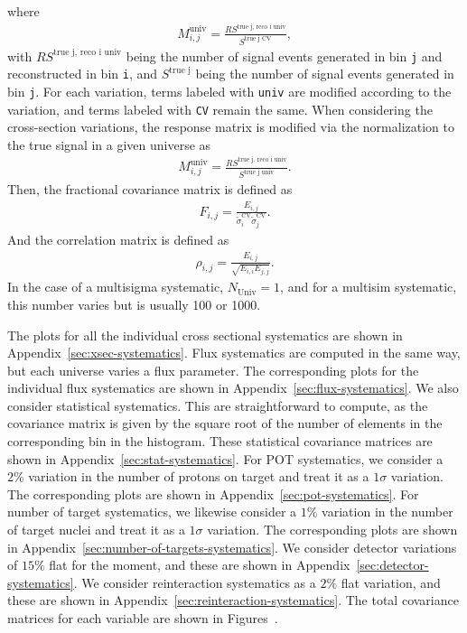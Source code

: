 \documentclass{article}
\begin{document}
where 
\begin{align}\label{eq:response-matrix}
    M_{i,j}^{\text{univ}} = \frac{RS^{\text{true j, reco i univ}}}{S^{\text{true j CV}}},
\end{align}
with $RS^{\text{true j, reco i univ}}$ being the number of signal events generated in bin \verb|j| and reconstructed in bin \verb|i|,
and $S^{\text{true j}}$ being the number of signal events generated in bin \verb|j|. For each variation, 
terms labeled with \verb|univ| are modified according to the variation, and terms labeled with \verb|CV| remain the same.
When considering the cross-section variations, the response matrix is modified via the normalization to the true signal 
in a given universe as 
\begin{align}
    M_{i,j}^{\text{univ}} = \frac{RS^{\text{true j, reco i univ}}}{S^{\text{true j univ}}}.
\end{align}
Then, the fractional covariance matrix is defined as 
\begin{align}
    F_{i,j} = \frac{E_{i,j}}{\tilde{\sigma}_i^\text{CV} \tilde{\sigma}_j^\text{CV}}.
\end{align}
And the correlation matrix is defined as
\begin{align}
    \rho_{i,j} = \frac{E_{i,j}}{\sqrt{E_{i,i} E_{j,j}}}.
\end{align}
In the case of a multisigma systematic, $N_{\text{Univ}} = 1$, and for a multisim systematic, this number varies but is usually 
100 or 1000.

The plots for all the individual cross sectional systematics are shown in Appendix~\ref{sec:xsec-systematics}. 
Flux systematics are computed in the same way, but each universe varies a flux parameter.
The corresponding plots for the individual flux systematics are shown in Appendix~\ref{sec:flux-systematics}.
We also consider statistical systematics. This are straightforward to compute, as the covariance matrix 
is given by the square root of the number of elements in the corresponding bin in the histogram. These statistical
covariance matrices are shown in Appendix~\ref{sec:stat-systematics}.
For POT systematics, we consider a $2\%$ variation in the number of protons on target and treat it as a 
$1\sigma$ variation. The corresponding plots are shown in Appendix~\ref{sec:pot-systematics}.
For number of target systematics, we likewise consider a $1\%$ variation in the number of target nuclei and treat it as a
$1\sigma$ variation. The corresponding plots are shown in Appendix~\ref{sec:number-of-targets-systematics}.
We consider detector variations of $15\%$ flat for the moment, and these are shown in Appendix~\ref{sec:detector-systematics}.
We consider reinteraction systematics as a $2\%$ flat variation, and these are shown in Appendix~\ref{sec:reinteraction-systematics}.
The total covariance matrices for each variable are shown in Figures~.
\end{document}
